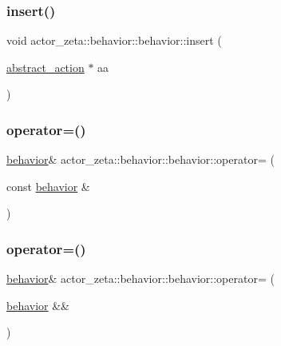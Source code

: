 \subsubsection{\texorpdfstring{insert()}{insert()}}
{\footnotesize\ttfamily void actor\+\_\+zeta\+::behavior\+::behavior\+::insert (\begin{DoxyParamCaption}\item[{\hyperlink{classactor__zeta_1_1behavior_1_1abstract__action}{abstract\+\_\+action} $\ast$}]{aa }\end{DoxyParamCaption})}

\mbox{\label{classactor__zeta_1_1behavior_1_1behavior_aee101abd51ff89624d10d212819e1536}} 
\subsubsection{\texorpdfstring{operator=()}{operator=()}\hspace{0.1cm}{\footnotesize\ttfamily [1/2]}}
{\footnotesize\ttfamily \hyperlink{classactor__zeta_1_1behavior_1_1behavior}{behavior}\& actor\+\_\+zeta\+::behavior\+::behavior\+::operator= (\begin{DoxyParamCaption}\item[{const \hyperlink{classactor__zeta_1_1behavior_1_1behavior}{behavior} \&}]{ }\end{DoxyParamCaption})\hspace{0.3cm}{\ttfamily [delete]}}

\mbox{\label{classactor__zeta_1_1behavior_1_1behavior_a6c2c0df75e9e3d506a8d1bb08624189e}} 
\subsubsection{\texorpdfstring{operator=()}{operator=()}\hspace{0.1cm}{\footnotesize\ttfamily [2/2]}}
{\footnotesize\ttfamily \hyperlink{classactor__zeta_1_1behavior_1_1behavior}{behavior}\& actor\+\_\+zeta\+::behavior\+::behavior\+::operator= (\begin{DoxyParamCaption}\item[{\hyperlink{classactor__zeta_1_1behavior_1_1behavior}{behavior} \&\&}]{ }\end{DoxyParamCaption})\hspace{0.3cm}{\ttfamily [default]}}

